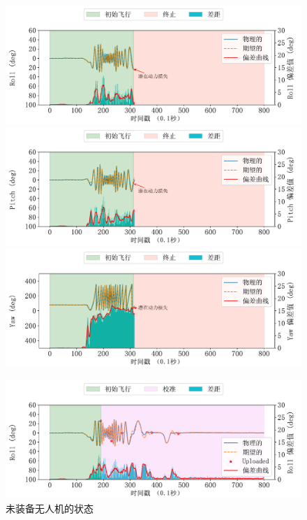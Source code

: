 \begin{figure}[htb]
\centering
\begin{minipage}{0.49\linewidth}
    \includegraphics[width=\linewidth]{fig/fix/fix/raw_thrust_roll.pdf}\quad
    \includegraphics[width=\linewidth]{fig/fix/fix/raw_thrust_pitch.pdf}\quad
    \includegraphics[width=\linewidth]{fig/fix/fix/raw_thrust_yaw.pdf}
    \caption{未装备\nyctea 无人机的状态}
    \label{subfig:fix_thurst_raw}
\end{minipage}
\begin{minipage}{0.49\linewidth}
\includegraphics[width=\linewidth]{fig/fix/fix/fix_thrust_roll.pdf}\quad

\end{minipage}
\end{figure}
